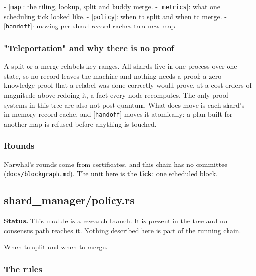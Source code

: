 \documentclass[11pt,a4paper]{article}
\begin{document}
- [\texttt{map}]: the tiling, lookup, split and buddy merge.
- [\texttt{metrics}]: what one scheduling tick looked like.
- [\texttt{policy}]: when to split and when to merge.
- [\texttt{handoff}]: moving per-shard record caches to a new map.

\subsubsection{"Teleportation" and why there is no proof}

A split or a merge relabels key ranges. All shards live in one process over
one state, so no record leaves the machine and nothing needs a proof: a
zero-knowledge proof that a relabel was done correctly would prove, at a cost
orders of magnitude above redoing it, a fact every node recomputes. The only
proof systems in this tree are also not post-quantum. What does move is each
shard's in-memory record cache, and [\texttt{handoff}] moves it atomically: a plan
built for another map is refused before anything is touched.

\subsubsection{Rounds}

Narwhal's rounds come from certificates, and this chain has no committee
(\texttt{docs/blockgraph.md}). The unit here is the \textbf{tick}: one scheduled block.

\subsection{shard\_manager/policy.rs}
\begin{framed}\noindent\textbf{Status.} This module is a research branch. It is present in the tree and no consensus path reaches it. Nothing described here is part of the running chain.\end{framed}

When to split and when to merge.

\subsubsection{The rules}
\end{document}
